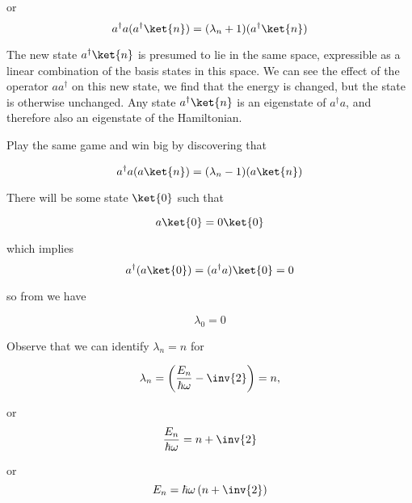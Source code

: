 or
\begin{equation}\label{eqn:PHY356FLecture11:100}
a^\dagger a (a^\dagger \ket{n} ) = (\lambda_n + 1) (a^\dagger \ket{n} )
\end{equation}

The new state $a^\dagger \ket{n}$ is presumed to lie in the same space, expressible as a linear combination of the basis states in this space.  We can see the effect of the operator $a a^\dagger$ on this new state, we find that the energy is changed, but the state is otherwise unchanged.  Any state $a^\dagger \ket{n}$ is an eigenstate of $a^\dagger a$, and therefore also an eigenstate of the Hamiltonian.

Play the same game and win big by discovering that

\begin{equation}\label{eqn:PHY356FLecture11:110}
a^\dagger a ( a \ket{n} ) = (\lambda_n -1) (a \ket{n} )
\end{equation}

There will be some state $\ket{0}$ such that

\begin{equation}\label{eqn:PHY356FLecture11:120}
a \ket{0} = 0 \ket{0}
\end{equation}

which implies
\begin{equation}\label{eqn:PHY356FLecture11:130}
a^\dagger (a \ket{0}) = (a^\dagger a) \ket{0} = 0
\end{equation}

so from  we have

\begin{equation}\label{eqn:PHY356FLecture11:140}
\lambda_0 = 0
\end{equation}

Observe that we can identify $\lambda_n = n$ for

\begin{equation}\label{eqn:PHY356FLecture11:150}
\lambda_n = \left( \frac{E_n}{\hbar\omega} - \inv{2} \right) = n,
\end{equation}

or
\begin{equation}\label{eqn:PHY356FLecture11:155}
\frac{E_n}{\hbar\omega} = n + \inv{2}
\end{equation}

or
\begin{equation}\label{eqn:PHY356FLecture11:160}
E_n = \hbar \omega \left( n + \inv{2} \right)
\end{equation}

